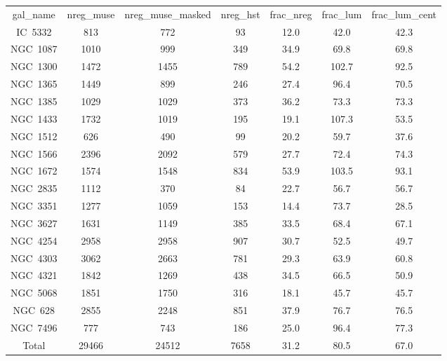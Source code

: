 \begin{table}
\begin{tabular}{ccccccc}
gal_name & nreg_muse & nreg_muse_masked & nreg_hst & frac_nreg & frac_lum & frac_lum_cent \\
IC~5332 & 813 & 772 & 93 & 12.0 & 42.0 & 42.3 \\
NGC~1087 & 1010 & 999 & 349 & 34.9 & 69.8 & 69.8 \\
NGC~1300 & 1472 & 1455 & 789 & 54.2 & 102.7 & 92.5 \\
NGC~1365 & 1449 & 899 & 246 & 27.4 & 96.4 & 70.5 \\
NGC~1385 & 1029 & 1029 & 373 & 36.2 & 73.3 & 73.3 \\
NGC~1433 & 1732 & 1019 & 195 & 19.1 & 107.3 & 53.5 \\
NGC~1512 & 626 & 490 & 99 & 20.2 & 59.7 & 37.6 \\
NGC~1566 & 2396 & 2092 & 579 & 27.7 & 72.4 & 74.3 \\
NGC~1672 & 1574 & 1548 & 834 & 53.9 & 103.5 & 93.1 \\
NGC~2835 & 1112 & 370 & 84 & 22.7 & 56.7 & 56.7 \\
NGC~3351 & 1277 & 1059 & 153 & 14.4 & 73.7 & 28.5 \\
NGC~3627 & 1631 & 1149 & 385 & 33.5 & 68.4 & 67.1 \\
NGC~4254 & 2958 & 2958 & 907 & 30.7 & 52.5 & 49.7 \\
NGC~4303 & 3062 & 2663 & 781 & 29.3 & 63.9 & 60.8 \\
NGC~4321 & 1842 & 1269 & 438 & 34.5 & 66.5 & 50.9 \\
NGC~5068 & 1851 & 1750 & 316 & 18.1 & 45.7 & 45.7 \\
NGC~628 & 2855 & 2248 & 851 & 37.9 & 76.7 & 76.5 \\
NGC~7496 & 777 & 743 & 186 & 25.0 & 96.4 & 77.3 \\
Total & 29466 & 24512 & 7658 & 31.2 & 80.5 & 67.0 \\
\end{tabular}
\end{table}
